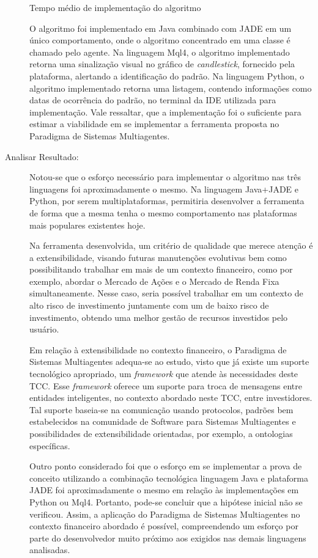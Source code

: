 \begin{description}
\begin{table}[h!]
	\caption{Tempo médio de implementação do algoritmo}
\end{table}

O algoritmo foi implementado em Java combinado com JADE em um único comportamento, onde o algoritmo concentrado em uma classe é chamado pelo agente. Na linguagem Mql4, o algoritmo implementado retorna uma sinalização visual no gráfico de \textit{candlestick}, fornecido pela plataforma, alertando a identificação do padrão. Na linguagem Python, o algoritmo implementado retorna uma listagem, contendo informações como datas de ocorrência do padrão, no terminal da IDE utilizada para implementação. Vale ressaltar, que a implementação foi o suficiente para estimar a viabilidade em se implementar a ferramenta proposta no Paradigma de Sistemas Multiagentes.

\item [Analisar Resultado:]
Notou-se que o esforço necessário para implementar o algoritmo nas três linguagens foi aproximadamente o mesmo. Na linguagem Java+JADE e Python, por serem multiplataformas, permitiria desenvolver a ferramenta de forma que a mesma tenha o mesmo comportamento nas plataformas mais populares existentes hoje.

Na ferramenta desenvolvida, um critério de qualidade que merece atenção é a extensibilidade, visando futuras manutenções evolutivas bem como possibilitando trabalhar em mais de um contexto financeiro, como por exemplo, abordar o Mercado de Ações e o Mercado de Renda Fixa simultaneamente. Nesse caso, seria possível trabalhar em um contexto de alto risco de investimento juntamente com um de baixo risco de investimento, obtendo uma melhor gestão de recursos investidos pelo usuário.

Em relação à extensibilidade no contexto financeiro, o Paradigma de Sistemas Multiagentes adequa-se ao estudo, visto que já existe um suporte tecnológico apropriado, um \textit{framework} que atende às necessidades deste TCC. Esse \textit{framework} oferece um suporte para troca de mensagens entre entidades inteligentes, no contexto abordado neste TCC, entre investidores. Tal suporte baseia-se na comunicação usando protocolos, padrões bem estabelecidos na comunidade de Software para Sistemas Multiagentes e possibilidades de extensibilidade orientadas, por exemplo, a ontologias específicas.

Outro ponto considerado foi que o esforço em se implementar a prova de conceito utilizando a combinação tecnológica linguagem Java e plataforma JADE foi aproximadamente o mesmo em relação às implementações em Python ou Mql4. Portanto, pode-se concluir que a hipótese inicial não se verificou. Assim, a aplicação do Paradigma de Sistemas Multiagentes no contexto financeiro abordado é possível, compreendendo um esforço por parte do desenvolvedor muito próximo aos exigidos nas demais linguagens analisadas.


\end{description}
